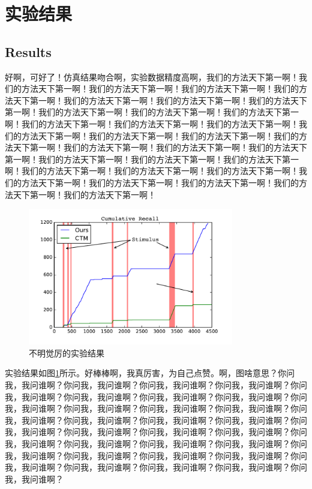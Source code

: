 \documentclass[a4paper,12pt]{book} %
\begin{document}
\section{实验结果}
\subsection{Results}

好啊，可好了！仿真结果吻合啊，实验数据精度高啊，我们的方法天下第一啊！我们的方法天下第一啊！我们的方法天下第一啊！我们的方法天下第一啊！我们的方法天下第一啊！我们的方法天下第一啊！我们的方法天下第一啊！我们的方法天下第一啊！我们的方法天下第一啊！我们的方法天下第一啊！我们的方法天下第一啊！我们的方法天下第一啊！我们的方法天下第一啊！我们的方法天下第一啊！我们的方法天下第一啊！我们的方法天下第一啊！我们的方法天下第一啊！我们的方法天下第一啊！我们的方法天下第一啊！我们的方法天下第一啊！我们的方法天下第一啊！我们的方法天下第一啊！我们的方法天下第一啊！我们的方法天下第一啊！我们的方法天下第一啊！我们的方法天下第一啊！我们的方法天下第一啊！我们的方法天下第一啊！我们的方法天下第一啊！我们的方法天下第一啊！我们的方法天下第一啊！我们的方法天下第一啊！

\begin{figure}[htbp]
\centering
\includegraphics[width=0.8\textwidth]{loss.pdf}
\caption{不明觉厉的实验结果}
\label{result}
\end{figure}

实验结果如图\ref{result}所示。好棒棒啊，我真厉害，为自己点赞。啊，图啥意思？你问我，我问谁啊？你问我，我问谁啊？你问我，我问谁啊？你问我，我问谁啊？你问我，我问谁啊？你问我，我问谁啊？你问我，我问谁啊？你问我，我问谁啊？你问我，我问谁啊？你问我，我问谁啊？你问我，我问谁啊？你问我，我问谁啊？你问我，我问谁啊？你问我，我问谁啊？你问我，我问谁啊？你问我，我问谁啊？你问我，我问谁啊？你问我，我问谁啊？你问我，我问谁啊？你问我，我问谁啊？你问我，我问谁啊？你问我，我问谁啊？你问我，我问谁啊？你问我，我问谁啊？你问我，我问谁啊？你问我，我问谁啊？你问我，我问谁啊？你问我，我问谁啊？你问我，我问谁啊？你问我，我问谁啊？你问我，我问谁啊？你问我，我问谁啊？你问我，我问谁啊？
\end{document}
